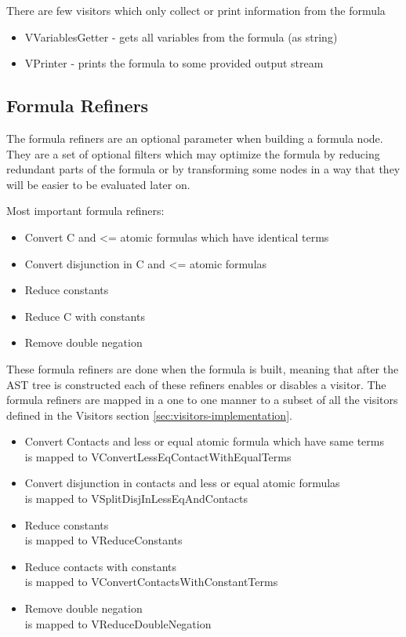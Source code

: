 \documentclass{article}
\begin{document}
			There are few visitors which only collect or print information from the formula
				\begin{itemize}
					\item VVariablesGetter - gets all variables from the formula (as string)
					\item VPrinter - prints the formula to some provided output stream
				\end{itemize}
	
		\subsection{Formula Refiners}
			The formula refiners are an optional parameter when building a formula node.
			They are a set of optional filters which may optimize the formula by reducing redundant parts of the 
			formula or by transforming some nodes in a way that they will be easier to be evaluated later on.
			
			Most important formula refiners:
			\begin{itemize}
				\item Convert C and <= atomic formulas which have identical terms
				\item Convert disjunction in C and <= atomic formulas
				\item Reduce constants
				\item Reduce C with constants
				\item Remove double negation
			\end{itemize}

			These formula refiners are done when the formula is built, meaning that after the 
			AST tree is constructed each of these refiners enables or disables a visitor. 
			The formula refiners are mapped in a one to one manner to a subset of all the visitors defined 
			in the Visitors section \ref{sec:visitors-implementation}.

			\begin{itemize}
				\item Convert Contacts and less or equal atomic formula which have same terms \\
					 is mapped to VConvertLessEqContactWithEqualTerms
				\item Convert disjunction in contacts and less or equal atomic formulas \\
					 is mapped to VSplitDisjInLessEqAndContacts
				\item Reduce constants \\
					 is mapped to VReduceConstants
				\item Reduce contacts with constants \\
					 is mapped to VConvertContactsWithConstantTerms
				\item Remove double negation \\
					 is mapped to VReduceDoubleNegation
			\end{itemize}
						
\end{document}
